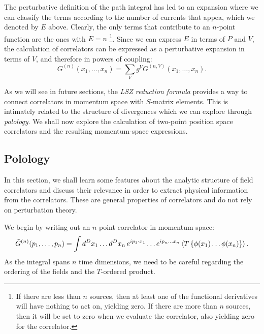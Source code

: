 \documentclass{article}
\numberwithin{equation}{section}
\begin{document}
The perturbative definition of the path integral has led to an expansion where we can classify the terms according to the number of currents that appea, which we denoted by $E$ above. Clearly, the only terms that contribute to an $n$-point function are the ones with $E=n$ \footnote{If there are less than $n$ sources, then at least one of the functional derivatives will have nothing to act on, yielding zero. If there are more than $n$ sources, then it will be set to zero when we evaluate the correlator, also yielding zero for the correlator.}. Since we can express $E$ in terms of $P$ and $V$, the calculation of correlators can be expressed as a perturbative expansion in terms of $V$, and therefore in powers of coupling:
\begin{equation}
    G^{(n)}(x_1, \dots, x_n) = \sum_V g^V G^{(n, V)}(x_1, \dots , x_n).
\end{equation}

As we will see in future sections, the \textit{LSZ reduction formula} provides a way to connect correlators in momentum space with $S$-matrix elements. This is intimately related to the structure of divergences which we can explore through \textit{polology}. We shall now explore the calculation of two-point position space correlators and the resulting momentum-space expressions.


\subsection{Polology}

In this section, we shall learn some features about the analytic structure of field correlators and discuss their relevance in order to extract physical information from the correlators. These are general properties of correlators and do not rely on perturbation theory.

We begin by writing out an $n$-point correlator in momentum space:
\begin{equation}
    \tilde{G}^{(n)} (p_1, \dots, p_n) = \int d^Dx_1 \dots d^Dx_n \, e^{ip_1\cdot x_1} \dots e^{ip_n \dots x_n} \ev{T\left\{\phi(x_1) \dots \phi(x_n)\right\}}.
\end{equation}
As the integral spans $n$ time dimensions, we need to be careful regarding the ordering of the fields and the $T$-ordered product.
\end{document}
